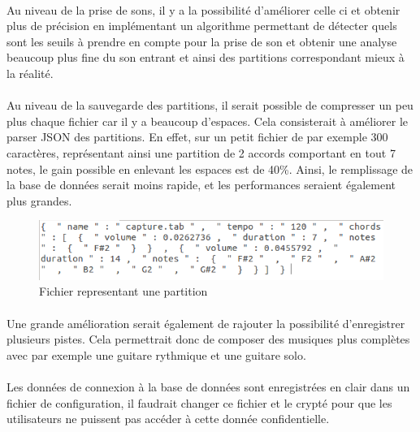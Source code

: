 \paragraph{}
Au niveau de la prise de sons, il y a la possibilité d'améliorer celle ci et obtenir plus de précision 
en implémentant un algorithme permettant de détecter quels sont les seuils à prendre en compte pour la prise de son 
et obtenir une analyse beaucoup plus fine du son entrant et ainsi des partitions correspondant mieux à la 
réalité. 
\paragraph{}
Au niveau de la sauvegarde des partitions, il serait possible de compresser un peu plus chaque fichier 
car il y a beaucoup d'espaces. Cela consisterait à améliorer le parser JSON des partitions. En effet, sur un petit fichier 
de par exemple 300 caractères, représentant ainsi une partition de 2 accords comportant en tout 7 notes, le gain 
possible en enlevant les espaces est de 40\%. Ainsi, le remplissage de la base de données serait moins rapide, 
et les performances seraient également plus grandes.

\begin{figure}[H]
\centering
\includegraphics[scale=0.5]{FichierPartition}
\caption{Fichier representant une partition}
\end{figure}


\paragraph{}
Une grande amélioration serait également de rajouter la possibilité d'enregistrer plusieurs pistes. Cela permettrait donc de 
composer des musiques plus complètes avec par exemple une guitare rythmique et une guitare solo.

\paragraph{}
Les données de connexion à la base de données sont enregistrées en clair dans un fichier de configuration, il faudrait changer 
ce fichier et le crypté pour que les utilisateurs ne puissent pas accéder à cette donnée confidentielle.
